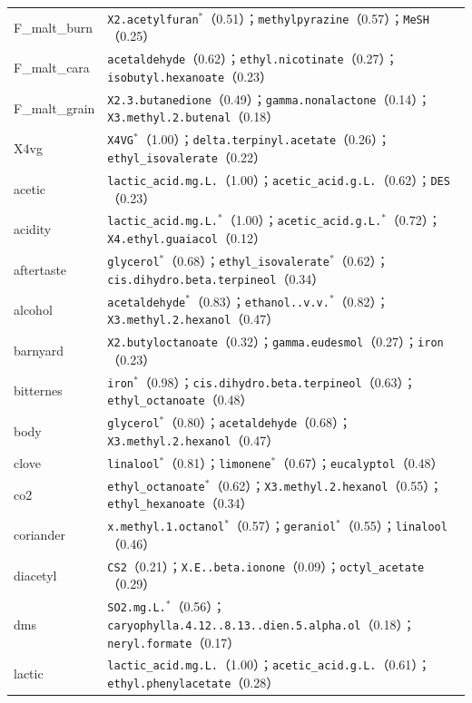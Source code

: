 \begin{longtable}{L{0.30\columnwidth}L{0.62\columnwidth}}
F\_malt\_burn & \texttt{X2.acetylfuran}$^{\ast}$（0.51）；\texttt{methylpyrazine}（0.57）；\texttt{MeSH}（0.25） \\
F\_malt\_cara & \texttt{acetaldehyde}（0.62）；\texttt{ethyl.nicotinate}（0.27）；\texttt{isobutyl.hexanoate}（0.23） \\
F\_malt\_grain & \texttt{X2.3.butanedione}（0.49）；\texttt{gamma.nonalactone}（0.14）；\texttt{X3.methyl.2.butenal}（0.18） \\
X4vg & \texttt{X4VG}$^{\ast}$（1.00）；\texttt{delta.terpinyl.acetate}（0.26）；\texttt{ethyl\_isovalerate}（0.22） \\
acetic & \texttt{lactic\_acid.mg.L.}（1.00）；\texttt{acetic\_acid.g.L.}（0.62）；\texttt{DES}（0.23） \\
acidity & \texttt{lactic\_acid.mg.L.}$^{\ast}$（1.00）；\texttt{acetic\_acid.g.L.}$^{\ast}$（0.72）；\texttt{X4.ethyl.guaiacol}（0.12） \\
aftertaste & \texttt{glycerol}$^{\ast}$（0.68）；\texttt{ethyl\_isovalerate}$^{\ast}$（0.62）；\texttt{cis.dihydro.beta.terpineol}（0.34） \\
alcohol & \texttt{acetaldehyde}$^{\ast}$（0.83）；\texttt{ethanol..v.v.}$^{\ast}$（0.82）；\texttt{X3.methyl.2.hexanol}（0.47） \\
barnyard & \texttt{X2.butyloctanoate}（0.32）；\texttt{gamma.eudesmol}（0.27）；\texttt{iron}（0.23） \\
bitternes & \texttt{iron}$^{\ast}$（0.98）；\texttt{cis.dihydro.beta.terpineol}（0.63）；\texttt{ethyl\_octanoate}（0.48） \\
body & \texttt{glycerol}$^{\ast}$（0.80）；\texttt{acetaldehyde}（0.68）；\texttt{X3.methyl.2.hexanol}（0.47） \\
clove & \texttt{linalool}$^{\ast}$（0.81）；\texttt{limonene}$^{\ast}$（0.67）；\texttt{eucalyptol}（0.48） \\
co2 & \texttt{ethyl\_octanoate}$^{\ast}$（0.62）；\texttt{X3.methyl.2.hexanol}（0.55）；\texttt{ethyl\_hexanoate}（0.34） \\
coriander & \texttt{x.methyl.1.octanol}$^{\ast}$（0.57）；\texttt{geraniol}$^{\ast}$（0.55）；\texttt{linalool}（0.46） \\
diacetyl & \texttt{CS2}（0.21）；\texttt{X.E..beta.ionone}（0.09）；\texttt{octyl\_acetate}（0.29） \\
dms & \texttt{SO2.mg.L.}$^{\ast}$（0.56）；\texttt{caryophylla.4.12..8.13..dien.5.alpha.ol}（0.18）；\texttt{neryl.formate}（0.17） \\
lactic & \texttt{lactic\_acid.mg.L.}（1.00）；\texttt{acetic\_acid.g.L.}（0.61）；\texttt{ethyl.phenylacetate}（0.28） \\

\end{longtable}
